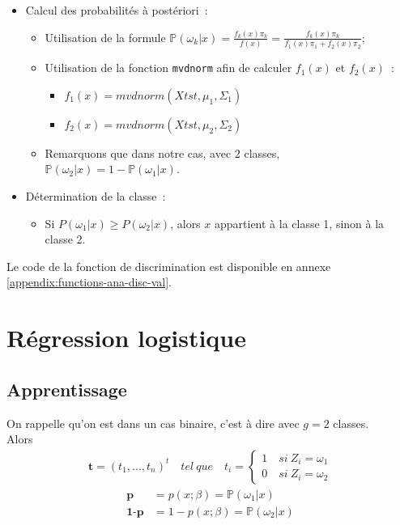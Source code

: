 \documentclass[a4paper,10pt]{report}
\begin{document}
\begin{itemize}
	\item Calcul des probabilités à postériori~:
	\begin{itemize}
		\item Utilisation de la formule $\mathbb{P}(\omega_k|x) = \frac{f_k(x)\pi_k}{f(x)} = \frac{f_k(x)\pi_k}{f_1(x)\pi_1 + f_2(x)\pi_2}$;
		\item Utilisation de la fonction \texttt{mvdnorm} afin de calculer $f_1(x)$ et $f_2(x)$~:
		\begin{itemize}
			\item $f_1(x) = mvdnorm(Xtst, \mu_1, \Sigma_1)$
			\item $f_2(x) = mvdnorm(Xtst, \mu_2, \Sigma_2)$
		\end{itemize}
		\item Remarquons que dans notre cas, avec 2 classes, $\mathbb{P}(\omega_2|x) = 1 - \mathbb{P}(\omega_1|x)$.
	\end{itemize}
	\item Détermination de la classe~:
	\begin{itemize}
		\item Si $P(\omega_1|x) \geq P(\omega_2|x)$, alors $x$ appartient à la classe 1, sinon à la classe 2.
	\end{itemize}
\end{itemize}


Le code de la fonction de discrimination est disponible en annexe \ref{appendix:functions-ana-disc-val}.

\section{Régression logistique}

\subsection{Apprentissage}

On rappelle qu'on est dans un cas binaire, c'est à dire avec $g=2$ classes.\\

Alors
\begin{align*}
\textbf{t} = (t_1, ..., t_n)^t \quad tel\ que \quad t_i = \left\{ 
\begin{array}{l}
1 \quad si\ Z_i = \omega_1 \\
0 \quad si\ Z_i = \omega_2
\end{array} 	\right.
\end{align*}
\begin{align*}
\textbf{p} &= p(x;\beta) = \mathbb{P}(\omega_1|x) \\
\textbf{1-p} &= 1-p(x;\beta) = \mathbb{P}(\omega_2|x)\\
\end{align*}
\end{document}
